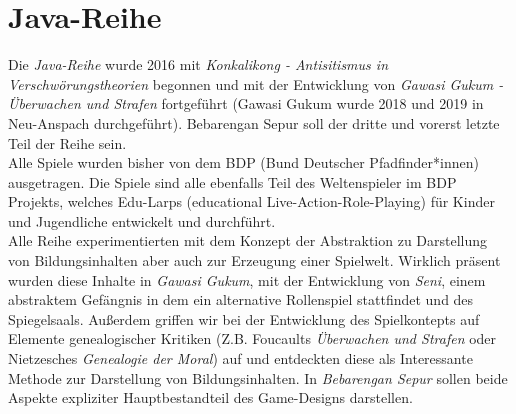 \documentclass[a4paper, 12pt]{scrartcl}
\begin{document}
    \section{Java-Reihe} \label{java-reihe}
    Die \textit{Java-Reihe} wurde 2016 mit \textit{Konkalikong - Antisitismus in Verschwörungstheorien} begonnen und mit der Entwicklung von \textit{Gawasi Gukum - Überwachen und Strafen} fortgeführt (Gawasi Gukum wurde 2018 und 2019 in Neu-Anspach durchgeführt).
    Bebarengan Sepur soll der dritte und vorerst letzte Teil der Reihe sein.\\ 
    Alle Spiele wurden bisher von dem BDP (Bund Deutscher Pfadfinder*innen) ausgetragen. 
    Die Spiele sind alle ebenfalls Teil des Weltenspieler im BDP Projekts, welches Edu-Larps (educational Live-Action-Role-Playing) für Kinder und Jugendliche entwickelt und durchführt. \\
    Alle Reihe experimentierten mit dem Konzept der Abstraktion zu Darstellung von Bildungsinhalten aber auch zur Erzeugung einer Spielwelt. 
    Wirklich präsent wurden diese Inhalte in \textit{Gawasi Gukum}, mit der Entwicklung von \textit{Seni}, einem abstraktem Gefängnis in dem ein alternative Rollenspiel stattfindet und des Spiegelsaals.
    Außerdem griffen wir bei der Entwicklung des Spielkontepts auf Elemente genealogischer Kritiken (Z.B. Foucaults \textit{Überwachen und Strafen} oder Nietzesches \textit{Genealogie der Moral}) auf und entdeckten diese als Interessante Methode zur Darstellung von Bildungsinhalten.
    In \textit{Bebarengan Sepur} sollen beide Aspekte expliziter Hauptbestandteil des Game-Designs darstellen. 

 
\end{document}
